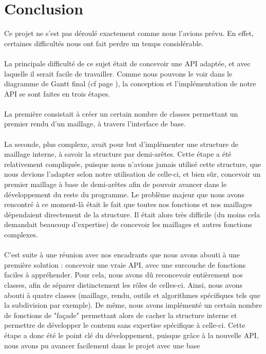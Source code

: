\documentclass[a4paper]{memoir}
\begin{document}
	\chapter{Conclusion}
		Ce projet ne s'est pas déroulé exactement comme nous l'avions prévu. En effet, certaines difficultés nous ont fait perdre un temps considérable.\\
		\\
		La principale difficulté de ce sujet était de concevoir une API adaptée, et avec laquelle il serait facile de travailler. Comme nous pouvons le voir 
		dans le diagramme de Gantt final (cf page \pageref{fig:gantt}), la conception et l'implémentation de notre API se sont faites en trois étapes.\\\\
		La première consistait à créer un certain nombre de classes permettant un premier rendu d'un maillage, à travers l'interface de base.\\\\ La seconde,
		plus  complexe, avait pour but d'implémenter une structure de maillage interne, à savoir la structure par demi-arêtes. Cette étape a été relativement
		compliquée, puisque nous n'avions jamais utilisé cette structure, que nous devions l'adapter selon notre utilisation de celle-ci, et bien sûr, 
		concevoir un premier maillage à base de demi-arêtes afin de pouvoir avancer dans le développement du reste du programme. Le problème majeur que nous 
		avons rencontré à ce moment-là était le fait que toutes nos fonctions et nos maillages dépendaient directement de la structure. Il était alors très 
		difficile (du moins cela demandait beaucoup d'expertise) de concevoir les maillages et autres fonctions complexes.\\\\ C'est suite à une réunion avec
		nos encadrants que nous avons abouti à une première solution : concevoir une vraie API, avec une surcouche de fonctions faciles à appréhender. Pour 
		cela, nous avons dû reconcevoir entièrement nos classes, afin de séparer distinctement les rôles de celles-ci. Ainsi, nous avons abouti à quatre 
		classes (maillage, rendu, outils et algorithmes spécifiques tels que la subdivision par exemple). De même, nous avons implémenté un certain nombre de
		fonctions de "façade" permettant alors de cacher la structure interne et permettre de développer le contenu sans expertise spécifique à celle-ci.
		Cette étape a donc été le point clé du développement, puisque grâce à la nouvelle API, nous avons pu avancer facilement dans le projet avec une base 
\end{document}
